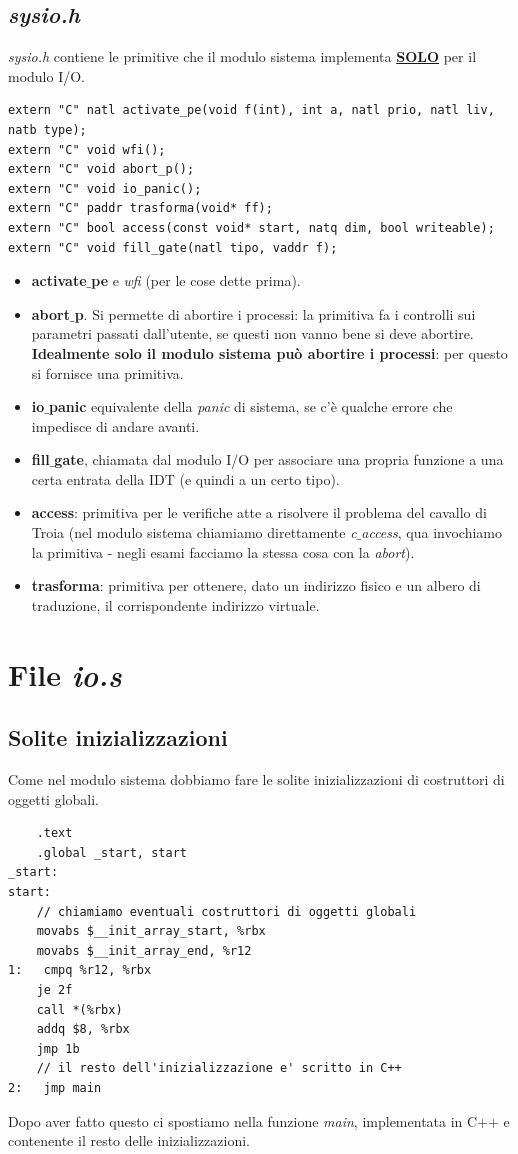 \documentclass[11pt]{report}
\theoremstyle{definition}
\begin{document}
\subsection{\emph{sysio.h}}
\emph{sysio.h} contiene le primitive che il modulo sistema implementa \textbf{\underline{SOLO}} per il modulo I/O. 
\small
\begin{verbatim}
extern "C" natl activate_pe(void f(int), int a, natl prio, natl liv, natb type);
extern "C" void wfi();
extern "C" void abort_p();
extern "C" void io_panic();
extern "C" paddr trasforma(void* ff);
extern "C" bool access(const void* start, natq dim, bool writeable);
extern "C" void fill_gate(natl tipo, vaddr f);
\end{verbatim}
\normalsize 
	\begin{itemize}
		\item \textbf{activate$\_$pe} e \emph{wfi} (per le cose dette prima).
		\item \textbf{abort$\_$p}. Si permette di abortire i processi: la primitiva fa i controlli sui parametri passati dall'utente, se questi non vanno bene si deve abortire. \textbf{Idealmente solo il modulo sistema può abortire i processi}: per questo si fornisce una primitiva.
		\item \textbf{io$\_$panic} equivalente della \emph{panic} di sistema, se c'è qualche errore che impedisce di andare avanti.
		
		\item \textbf{fill$\_$gate}, chiamata dal modulo I/O per associare una propria funzione a una certa entrata della IDT (e quindi a un certo tipo).
		
		\item \textbf{access}: primitiva per le verifiche atte a risolvere il problema del cavallo di Troia (nel modulo sistema chiamiamo direttamente \emph{c$\_$access}, qua invochiamo la primitiva - negli esami facciamo la stessa cosa con la \emph{abort}).
		
		\item \textbf{trasforma}: primitiva per ottenere, dato un indirizzo fisico e un albero di traduzione, il corrispondente indirizzo virtuale.
	\end{itemize}  

\section{File \emph{io.s}}
\subsection{Solite inizializzazioni} 
Come nel modulo sistema dobbiamo fare le solite inizializzazioni di costruttori di oggetti globali.
\small
\begin{verbatim}
    .text
    .global _start, start
_start:
start:
    // chiamiamo eventuali costruttori di oggetti globali
    movabs $__init_array_start, %rbx
    movabs $__init_array_end, %r12
1:	 cmpq %r12, %rbx
    je 2f
    call *(%rbx)
    addq $8, %rbx
    jmp 1b
    // il resto dell'inizializzazione e' scritto in C++
2:	 jmp main
\end{verbatim}
\normalsize 
Dopo aver fatto questo ci spostiamo nella funzione \emph{main}, implementata in C++ e contenente il resto delle inizializzazioni.
\end{document}
